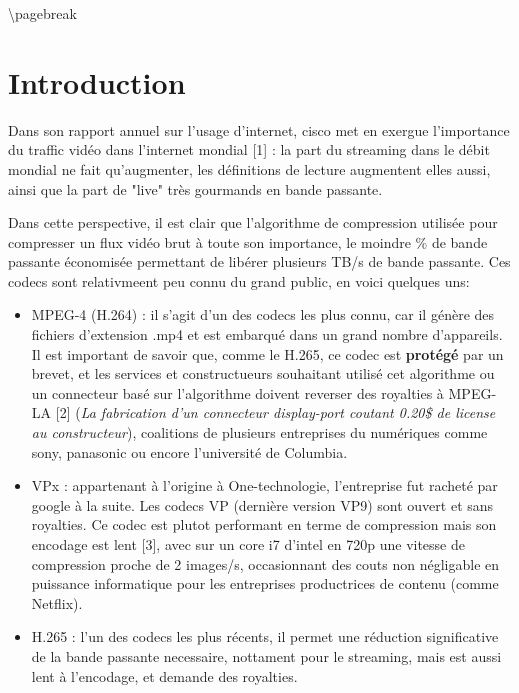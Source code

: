 \documentclass[
  french,
]{article}
\begin{document}
\textbackslash pagebreak

\hypertarget{header-n22}{%
\section{Introduction}\label{header-n22}}

Dans son rapport annuel sur l'usage d'internet, cisco met en exergue
l'importance du traffic vidéo dans l'internet mondial {[}1{]} : la part
du streaming dans le débit mondial ne fait qu'augmenter, les définitions
de lecture augmentent elles aussi, ainsi que la part de "live" très
gourmands en bande passante.

Dans cette perspective, il est clair que l'algorithme de compression
utilisée pour compresser un flux vidéo brut à toute son importance, le
moindre \% de bande passante économisée permettant de libérer plusieurs
TB/s de bande passante. Ces codecs sont relativmeent peu connu du grand
public, en voici quelques uns:

\begin{itemize}
\item
  MPEG-4 (H.264) : il s'agit d'un des codecs les plus connu, car il
  génère des fichiers d'extension .mp4 et est embarqué dans un grand
  nombre d'appareils. Il est important de savoir que, comme le H.265, ce
  codec est \textbf{protégé} par un brevet, et les services et
  constructueurs souhaitant utilisé cet algorithme ou un connecteur basé
  sur l'algorithme doivent reverser des royalties à MPEG-LA {[}2{]}
  (\emph{La fabrication d'un connecteur display-port coutant 0.20\$ de
  license au constructeur}), coalitions de plusieurs entreprises du
  numériques comme sony, panasonic ou encore l'université de Columbia.
\item
  VPx : appartenant à l'origine à One-technologie, l'entreprise fut
  racheté par google à la suite. Les codecs VP (dernière version VP9)
  sont ouvert et sans royalties. Ce codec est plutot performant en terme
  de compression mais son encodage est lent {[}3{]}, avec sur un core i7
  d'intel en 720p une vitesse de compression proche de 2 images/s,
  occasionnant des couts non négligable en puissance informatique pour
  les entreprises productrices de contenu (comme Netflix).
\item
  H.265 : l'un des codecs les plus récents, il permet une réduction
  significative de la bande passante necessaire, nottament pour le
  streaming, mais est aussi lent à l'encodage, et demande des royalties.
\end{itemize}
\end{document}
